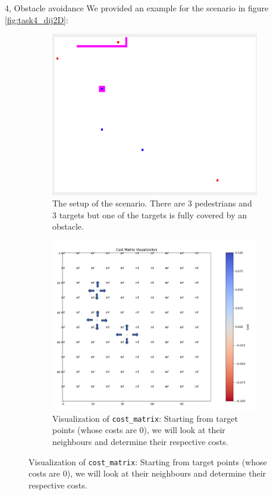 \documentclass[10pt,a4paper]{article}
\begin{document}
\begin{task}{4, Obstacle avoidance}
We provided an example for the scenario in figure \ref{fig:task4_dij2D}:





\begin{figure}[H]

\begin{center}
    

\begin{subfigure}{0.65\textwidth}
 \centering
 \includegraphics[width=1\textwidth]{images/task4_dij_2d.png}
 \caption{The setup of the scenario. There are 3 pedestrians and 3 targets but one of the targets is fully covered by an obstacle. }
 \end{subfigure}
 
\begin{subfigure}{0.65\textwidth}
 \centering
 \includegraphics[width=1\textwidth]{images/task4_dij_2d_very_start.png}
 \caption{Visualization of \texttt{cost\_matrix}: Starting from target points (whose costs are 0), we will look at their neighbours and determine their respective costs.} 
 \end{subfigure}


\end{center}
\end{figure}
\end{task}
\end{document}
